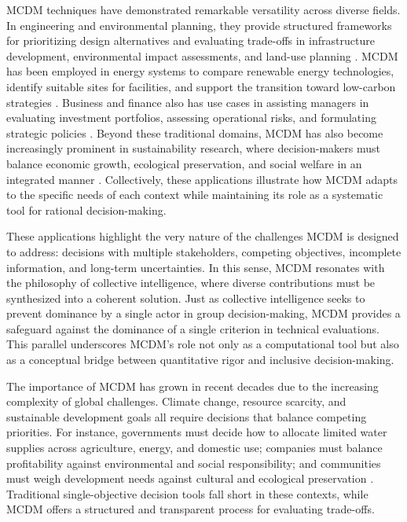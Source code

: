 MCDM techniques have demonstrated remarkable versatility across diverse fields. In engineering and environmental planning, they provide structured frameworks for prioritizing design alternatives and evaluating trade-offs in infrastructure development, environmental impact assessments, and land-use planning \cite{karakus2022,Dirie2024}. MCDM has been employed in energy systems to compare renewable energy technologies, identify suitable sites for facilities, and support the transition toward low-carbon strategies \cite{POHEKAR2004}. Business and finance also has use cases in assisting managers in evaluating investment portfolios, assessing operational risks, and formulating strategic policies \cite{TAMIZ1998}. Beyond these traditional domains, MCDM has also become increasingly prominent in sustainability research, where decision-makers must balance economic growth, ecological preservation, and social welfare in an integrated manner \cite{ettazarini2021,Mardani2015}. Collectively, these applications illustrate how MCDM adapts to the specific needs of each context while maintaining its role as a systematic tool for rational decision-making.

These applications highlight the very nature of the challenges MCDM is designed to address: decisions with multiple stakeholders, competing objectives, incomplete information, and long-term uncertainties. In this sense, MCDM resonates with the philosophy of collective intelligence, where diverse contributions must be synthesized into a coherent solution\cite{Cinalli2015}. Just as collective intelligence seeks to prevent dominance by a single actor in group decision-making, MCDM provides a safeguard against the dominance of a single criterion in technical evaluations. This parallel underscores MCDM's role not only as a computational tool but also as a conceptual bridge between quantitative rigor and inclusive decision-making.   

The importance of MCDM has grown in recent decades due to the increasing complexity of global challenges. Climate change, resource scarcity, and sustainable development goals all require decisions that balance competing priorities. For instance, governments must decide how to allocate limited water supplies across agriculture, energy, and domestic use; companies must balance profitability against environmental and social responsibility; and communities must weigh development needs against cultural and ecological preservation \cite{KUMAR2017596,PortnerIPCC2022}. Traditional single-objective decision tools fall short in these contexts, while MCDM offers a structured and transparent process for evaluating trade-offs.

